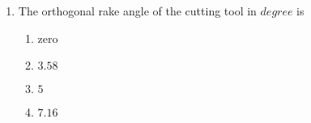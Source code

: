 \documentclass[journal]{IEEEtran}
\numberwithin{equation}{enumi}
\numberwithin{figure}{enumi}
\begin{document}
\begin{enumerate}
    \begin{multicols}{4}
        \begin{enumerate}
            \item $71$
            \item $76$
            \item $79$
            \item $81$
        \end{enumerate}
    \end{multicols}

    \begin{center}
        Linked Answer Questions
    \end{center}
    \begin{center}
        Statement for Linked Answer Questions 52 \& 53: \ref{52}
    \end{center}
    In orthogonal turning of a bar of $100 mm$ diameter with a feed of $0.25 \frac{mm}{rev}$, depth of cut of $4 mm$ and cutting velocity of $90 \frac{m}{min}$, it is observed that the main  cutting force is perpendicular to the friction force acting at the chip-tool interface. The main  cutting force is $1500 N$.\\

    \item 
    The orthogonal rake angle of the cutting tool in $degree$ is \label{52}
    \hfill{}
    \begin{multicols}{4}
        \begin{enumerate}
            \item zero
            \item $3.58$
            \item $5$
            \item $7.16$
        \end{enumerate}
    \end{multicols}

\end{enumerate}
\end{document}
